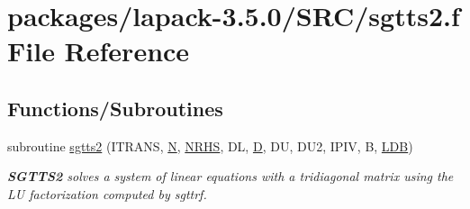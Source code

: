 \hypertarget{sgtts2_8f}{}\section{packages/lapack-\/3.5.0/\+S\+R\+C/sgtts2.f File Reference}
\label{sgtts2_8f}
\subsection*{Functions/\+Subroutines}
\begin{DoxyCompactItemize}
\item 
subroutine \hyperlink{group__realGTcomputational_ga913327540f64843e724055d28babf247}{sgtts2} (I\+T\+R\+A\+N\+S, \hyperlink{polmisc_8c_a0240ac851181b84ac374872dc5434ee4}{N}, \hyperlink{example__user_8c_aa0138da002ce2a90360df2f521eb3198}{N\+R\+H\+S}, D\+L, \hyperlink{odrpack_8h_a7dae6ea403d00f3687f24a874e67d139}{D}, D\+U, D\+U2, I\+P\+I\+V, B, \hyperlink{example__user_8c_a50e90a7104df172b5a89a06c47fcca04}{L\+D\+B})
\begin{DoxyCompactList}\small\item\em {\bfseries S\+G\+T\+T\+S2} solves a system of linear equations with a tridiagonal matrix using the L\+U factorization computed by sgttrf. \end{DoxyCompactList}\end{DoxyCompactItemize}
